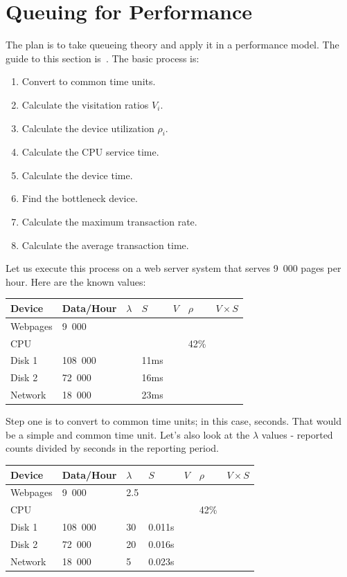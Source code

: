 \section*{Queuing for Performance}

The plan is to take queueing theory and apply it in a performance model. The guide to this section is~\cite{williams-perf}. The basic process is:

\begin{enumerate}
	\item Convert to common time units.
	\item Calculate the visitation ratios $V_{i}$.
	\item Calculate the device utilization $\rho_{i}$.
	\item Calculate the CPU service time.
	\item Calculate the device time.
	\item Find the bottleneck device.
	\item Calculate the maximum transaction rate.
	\item Calculate the average transaction time.
\end{enumerate}

Let us execute this process on a web server system that serves 9~000 pages per hour. Here are the known values:

\begin{center}
\begin{tabular}{|l|l|l|l|l|l|l|} \hline
	\textbf{Device} & \textbf{Data/Hour} & \textbf{$\lambda$} & \textbf{$S$} & \textbf{$V$} & \textbf{$\rho$} & \textbf{$V \times S$} \\ \hline
	Webpages & 9~000 & & & & & \\ \hline
	CPU & & & & &  42\% & \\ \hline
	Disk 1 & 108~000 & & 11ms & & &\\ \hline
	Disk 2 & 72~000 & & 16ms & & &\\ \hline
	Network & 18~000 & & 23ms & & &\\ \hline
\end{tabular}
\end{center}

Step one is to convert to common time units; in this case, seconds. That would be a simple and common time unit. Let's also look at the $\lambda$ values - reported counts divided by seconds in the reporting period.

\begin{center}
\begin{tabular}{|l|l|l|l|l|l|l|} \hline
	\textbf{Device} & \textbf{Data/Hour} & \textbf{$\lambda$} & \textbf{$S$} & \textbf{$V$} & \textbf{$\rho$} & \textbf{$V \times S$} \\ \hline
	Webpages & 9~000 & 2.5 & & & & \\ \hline
	CPU & & & & & 42\% & \\ \hline
	Disk 1 & 108~000 & 30 & 0.011s  & & &\\ \hline
	Disk 2 & 72~000 & 20 & 0.016s & & &\\ \hline
	Network & 18~000 & 5 & 0.023s & & &\\ \hline
\end{tabular}
\end{center}

